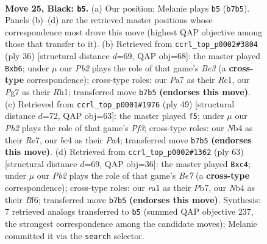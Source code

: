 \documentclass[11pt]{article}
\begin{document}
\clearpage

\begin{figure}[p]\centering
\begin{subfigure}{0.46\textwidth}\centering
\resizebox{\linewidth}{!}{%
\newchessgame
\chessboard[
  setfen={r6k/ppbb2pp/P4n2/5p2/1nB2P2/1P2P1P1/8/RNB2RK1 b - - 0 25},
  showmover=false,
  pgfstyle=straightmove, color=movearrow, markmove={b7-b5}
]}
\caption{}
\end{subfigure}\hfill
\begin{subfigure}{0.46\textwidth}\centering
\resizebox{\linewidth}{!}{%
\newchessgame
\chessboard[
  setfen={r1b1r1k1/pp4p1/1bn1pPN1/7p/7P/2P1BPP1/P7/2R1KB1R w K - 1 19},
  showmover=false,
  pgfstyle=straightmove, color=movearrow, markmove={e3-b6}
]}
\caption{}
\end{subfigure}
\\[4pt]
\begin{subfigure}{0.46\textwidth}\centering
\resizebox{\linewidth}{!}{%
\newchessgame
\chessboard[
  setfen={r5k1/2p1rbpp/2p2p2/4P3/p1P5/P1B3P1/1P5P/3RR1K1 b - - 0 25},
  showmover=false,
  pgfstyle=straightmove, color=movearrow, markmove={f6-f5}
]}
\caption{}
\end{subfigure}\hfill
\begin{subfigure}{0.46\textwidth}\centering
\resizebox{\linewidth}{!}{%
\newchessgame
\chessboard[
  setfen={4r3/1p2p2k/3P1bpp/3P1p2/1PN2B1P/1R4P1/r3bP2/2R3K1 b - - 0 32},
  showmover=false,
  pgfstyle=straightmove, color=movearrow, markmove={e2-c4}
]}
\caption{}
\end{subfigure}
\caption{\textbf{Move 25, Black: \texttt{b5}.} (a) Our position; Melanie plays \texttt{b5} (\texttt{b7b5}). Panels (b)--(d) are the retrieved master positions whose correspondence most drove this move (highest QAP objective among those that transfer to it). (b) Retrieved from \texttt{ccrl\_top\_p0002\#3804} (ply 36) [structural distance $d$=69, QAP obj=68]: the master played \texttt{Bxb6}; under $\mu$ our \emph{Pb2} plays the role of that game's \emph{Be3} (a \textbf{cross-type} correspondence); cross-type roles: our \emph{P}a7 as their \emph{R}c1, our \emph{P}g7 as their \emph{R}h1; transferred move \texttt{b7b5} \textbf{(endorses this move)}. (c) Retrieved from \texttt{ccrl\_top\_p0001\#1976} (ply 49) [structural distance $d$=72, QAP obj=63]: the master played \texttt{f5}; under $\mu$ our \emph{Pb2} plays the role of that game's \emph{Pf3}; cross-type roles: our \emph{N}b4 as their \emph{R}e7, our \emph{b}c4 as their \emph{P}a4; transferred move \texttt{b7b5} \textbf{(endorses this move)}. (d) Retrieved from \texttt{ccrl\_top\_p0002\#1362} (ply 63) [structural distance $d$=69, QAP obj=36]: the master played \texttt{Bxc4}; under $\mu$ our \emph{Pb2} plays the role of that game's \emph{Be7} (a \textbf{cross-type} correspondence); cross-type roles: our \emph{r}a1 as their \emph{P}b7, our \emph{N}b4 as their \emph{B}f6; transferred move \texttt{b7b5} \textbf{(endorses this move)}. Synthesis: 7 retrieved analogs transferred to \texttt{b5} (summed QAP objective 237, the strongest correspondence among the candidate moves); Melanie committed it via the \texttt{search} selector.}
\label{fig:thought-m49}
\end{figure}
\end{document}

